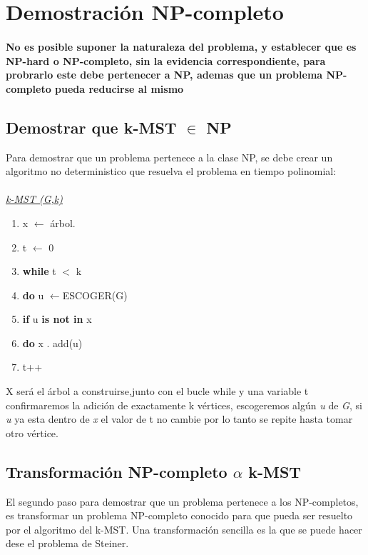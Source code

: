 \documentclass[spanish,12pt]{elsarticle}
\newcommand{\blank}[1]{\hspace*{#1}}
\begin{document}
\section{Demostración NP-completo}
\paragraph{\textnormal{No es posible suponer la naturaleza del problema, y establecer que es NP-hard o NP-completo, sin la evidencia correspondiente, para probrarlo este debe pertenecer a NP, ademas que un problema NP-completo pueda reducirse al mismo}}
\subsection{Demostrar que k-MST $\in$ NP}
Para demostrar que un problema pertenece a la clase NP, se debe crear un algoritmo no deterministico que resuelva el problema en tiempo polinomial:\\\\
\textit{\underline{k-MST (G,k)} }
\begin{enumerate}
    \item \textnormal{x $\leftarrow$ árbol.}
    \item  \textnormal{t $\leftarrow$ 0}
    \item  \textnormal{\textbf{while} t $<$ k}
    \item \textnormal{\blank{1cm}\textbf{do} u $\leftarrow${ESCOGER(G)}}
    \item  \textnormal{\blank{2cm}\textbf{if} u \textbf{is not in} x}
    \item \textnormal{\blank{3cm}\textbf{do} x . add(u)}
     \item \textnormal{\blank{3cm} t++}\\
\end{enumerate}
X será el árbol a construirse,junto con el bucle while y una variable t confirmaremos la adición de  exactamente k vértices, escogeremos algún \textit{u} de \textit{G}, si \textit{u} ya esta dentro de \textit{x} el valor de t no cambie por lo tanto se repite hasta tomar otro vértice.
\subsection{Transformación NP-completo $\alpha$  k-MST}
El segundo paso para demostrar que un problema pertenece a los NP-completos, es transformar un problema NP-completo conocido para que pueda ser resuelto por el algoritmo del k-MST. Una transformación sencilla es la que se puede hacer dese el problema de Steiner.
\end{document}
